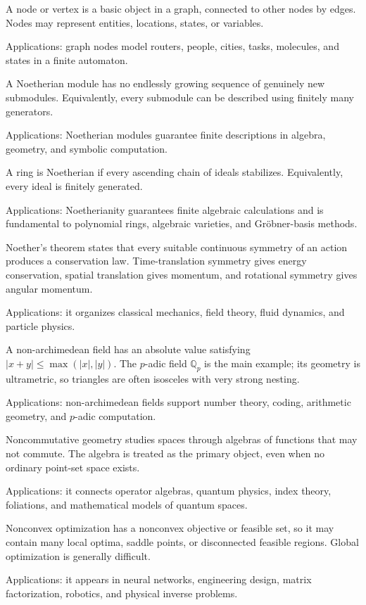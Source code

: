 A node or vertex is a basic object in a graph, connected to other nodes by edges. Nodes may represent entities, locations, states, or variables. \par\noindent Applications: graph nodes model routers, people, cities, tasks, molecules, and states in a finite automaton.

A Noetherian module has no endlessly growing sequence of genuinely new submodules. Equivalently, every submodule can be described using finitely many generators. \par\noindent Applications: Noetherian modules guarantee finite descriptions in algebra, geometry, and symbolic computation.

A ring is Noetherian if every ascending chain of ideals stabilizes. Equivalently, every ideal is finitely generated. \par\noindent Applications: Noetherianity guarantees finite algebraic calculations and is fundamental to polynomial rings, algebraic varieties, and Gröbner-basis methods.

Noether's theorem states that every suitable continuous symmetry of an action produces a conservation law. Time-translation symmetry gives energy conservation, spatial translation gives momentum, and rotational symmetry gives angular momentum. \par\noindent Applications: it organizes classical mechanics, field theory, fluid dynamics, and particle physics.

A non-archimedean field has an absolute value satisfying $|x+y|\leq\max(|x|,|y|)$. The $p$-adic field $\mathbb Q_p$ is the main example; its geometry is ultrametric, so triangles are often isosceles with very strong nesting. \par\noindent Applications: non-archimedean fields support number theory, coding, arithmetic geometry, and $p$-adic computation.

Noncommutative geometry studies spaces through algebras of functions that may not commute. The algebra is treated as the primary object, even when no ordinary point-set space exists. \par\noindent Applications: it connects operator algebras, quantum physics, index theory, foliations, and mathematical models of quantum spaces.

Nonconvex optimization has a nonconvex objective or feasible set, so it may contain many local optima, saddle points, or disconnected feasible regions. Global optimization is generally difficult. \par\noindent Applications: it appears in neural networks, engineering design, matrix factorization, robotics, and physical inverse problems.

